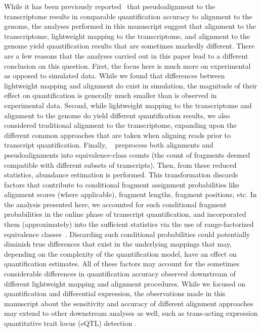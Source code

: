 While it has been previously
reported~\citep{direct_comparison} that pseudoalignment to the transcriptome
results in comparable quantification accuracy to alignment to the genome, the analyses
performed in this manuscript suggest that alignment to the transcriptome,
lightweight mapping to the transcriptome, and alignment to the genome yield
quantification results that are sometimes markedly different.
There are a few reasons that the analyses carried out in this paper lead to a
different conclusion on this question. First, the focus here is much more on
experimental as opposed to simulated data. While we found that differences
between lightweight mapping and alignment do exist in simulation, the magnitude
of their effect on quantification is generally much smaller than is observed in
experimental data. Second, while lightweight mapping to the transcriptome and alignment
to the genome do yield different quantification results, we also considered
traditional alignment to the
transcriptome, expanding upon the different common approaches that are taken
when aligning reads prior to transcript quantification. Finally, \citeauthor{direct_comparison}~\citep{direct_comparison} 
preprocess both alignments and
pseudoalignments into equivalence-class counts (the count of fragments deemed
compatible with different subsets of transcripts). Then, from these reduced
statistics, abundance estimation is performed. This transformation 
discards factors that contribute to conditional fragment assignment
probabilities like alignment scores (where applicable), fragment lengths, fragment positions, etc.
In the analysis presented here, we accounted for such conditional fragment
probabilities in the online phase of transcript quantification, and incorporated
them (approximately) into the sufficient statistics via the use of
range-factorized equivalence classes~\citep{ddfact}. Discarding such conditional
probabilities could potentially diminish true differences that exist in the
underlying mappings that may, depending on the complexity of the quantification
model, have an effect on quantification estimates. All of these factors may
account for the sometimes considerable differences in quantification accuracy
observed downstream of different lightweight mapping and alignment procedures.
While we focused on quantification and differential expression,
the observations made in this manuscript about the sensitivity
  and accuracy of different alignment approaches may extend to other
downstream analyses as well, such as trans-acting expression quantitative trait
locus (eQTL) detection \cite{saha2018false}.

